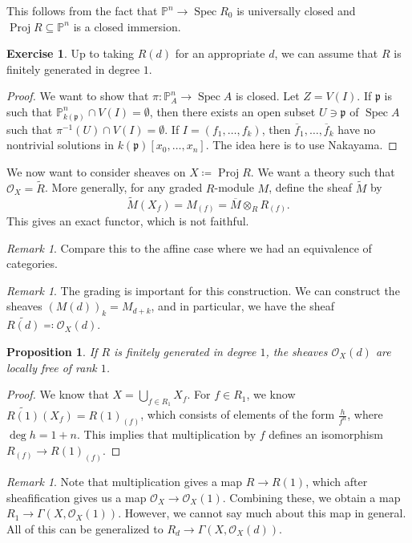 \documentclass[leqno, openany]{memoir}
\newtheorem{prop}[thm]{Proposition}
\theoremstyle{definition}
\newtheorem{exer}[thm]{Exercise}
\theoremstyle{remark}
\newtheorem{rmk}[thm]{Remark}
\theoremstyle{plain}
\theoremstyle{definition}
\theoremstyle{remark}
\renewcommand{\P}{\mathbb{P}}
\newcommand{\M}{\overline{M}}
\newcommand{\mc}[1]{\mathcal{#1}}
\newcommand{\mf}[1]{\mathfrak{#1}}
\newcommand{\ol}[1]{\overline{#1}}
\newcommand{\wt}[1]{\widetilde{#1}}
\DeclareMathOperator{\Spec}{Spec}
\DeclareMathOperator{\Proj}{Proj}
\begin{document}
This follows from the fact that $\P^n \to \Spec R_0$ is universally closed and
$\Proj R \subseteq \P^n$ is a closed immersion.

\begin{exer} Up to taking $R(d)$ for an appropriate $d$, we can assume that $R$
is finitely generated in degree $1$.  \end{exer}

\begin{proof} We want to show that $\pi \colon \P^n_A \to \Spec A$ is closed.
    Let $Z = V(I)$. If $\mf{p}$ is such that $\P^n_{k(\mf{p})} \cap V(I) =
    \emptyset$, then there exists an open subset $U \ni \mf{p}$ of $\Spec A$
    such that $\pi^{-1}(U) \cap V(I) = \emptyset$. If $I = (f_1, \ldots, f_k)$,
    then $\ol{f}_1, \ldots, \ol{f}_k$ have no nontrivial solutions in
    $k(\mf{p})[x_0, \ldots, x_n]$. The idea here is to use Nakayama.
\end{proof}

We now want to consider sheaves on $X \coloneqq \Proj R$. We want a theory such
that $\mc{O}_X = \wt{R}$. More generally, for any graded $R$-module $M$, define
the sheaf $\wt{M}$ by \[ \wt{M}(X_f) = M_{(f)} = \M \otimes_R R_{(f)}. \] This
gives an exact functor, which is not faithful.

\begin{rmk} Compare this to the affine case where we had an equivalence of
categories.  \end{rmk}

\begin{rmk} The grading is important for this construction. We can construct
the sheaves ${(M(d))}_k = M_{d+k}$, and in particular, we have the sheaf
$\wt{R(d)} \eqqcolon \mc{O}_X(d)$.  \end{rmk}

\begin{prop} If $R$ is finitely generated in degree $1$, the sheaves
$\mc{O}_X(d)$ are locally free of rank $1$.  \end{prop}

\begin{proof} We know that $X = \bigcup_{f \in R_1} X_f$. For $f \in R_1$, we
    know $\wt{R(1)}(X_f) = {R(1)}_(f)$, which consists of elements of the form
    $\frac{h}{f^n}$, where $\deg h = 1+n$. This implies that multiplication by
    $f$ defines an isomorphism $R_{(f)} \to {R(1)}_{(f)}$.  \end{proof}

\begin{rmk} Note that multiplication gives a map $R \to R(1)$, which after
    sheafification gives us a map $\mc{O}_X \to \mc{O}_X(1)$. Combining these,
    we obtain a map $R_1 \to \Gamma(X, \mc{O}_X(1))$. However, we cannot say
    much about this map in general. All of this can be generalized to $R_d \to
    \Gamma(X, \mc{O}_X(d))$.  \end{rmk}
\end{document}

